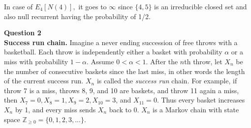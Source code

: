 \documentclass[12pt]{article}
\begin{document}
In case of $E_4[N(4)],$ it goes to $\infty$ since $\{4,5\}$ is an irreducible closed set and also null recurrent having the probability of 1/2.


\vspace{1.5\baselineskip}
\noindent

\newpage
\noindent
\textbf{Question 2}\\
\noindent
\textbf{Success run chain.} Imagine a never ending succession of free throws with a basketball.
Each throw is independently either a basket with probability $\alpha$ or a miss with probability $1-\alpha$. Assume $0 < \alpha < 1$. After the $n$th throw, let $X_n$ be the number of consecutive baskets since the last miss, in other words the length of the current success run. $X_n$ is called the \textit{success run} chain. For example, if throw 7 is a miss, throws 8, 9, and 10 are baskets, and throw 11 again a miss, then $X_7 = 0, X_8 = 1, X_9 = 2, X_{10} = 3$, and $X_{11} = 0$. Thus every basket increases $X_n$ by 1, and every miss sends $X_n$ back to 0. $X_n$ is a Markov chain with state space $\mathbb{Z}_{\ge 0} = \{0,1,2,3,...\}.$
\end{document}
